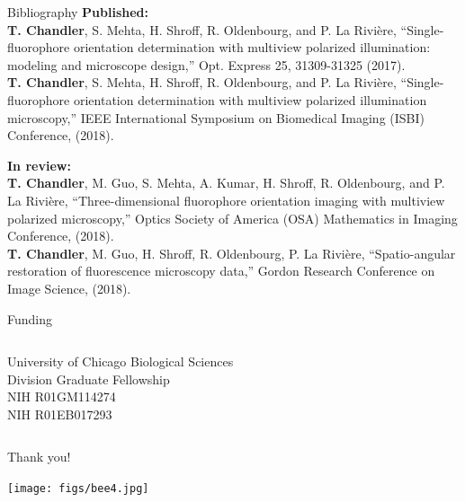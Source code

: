 \documentclass[presentation]{beamer}
\begin{document}
\begin{frame}{Bibliography}\small
\textbf{Published:}  \\ \vspace{0.5em}
\textbf{T. Chandler}, S. Mehta, H. Shroff, R. Oldenbourg, and P. La Rivière, ``Single-fluorophore orientation determination with multiview polarized illumination: modeling and microscope design,'' Opt. Express  25, 31309-31325 (2017).\\

\textbf{T. Chandler}, S. Mehta, H. Shroff, R. Oldenbourg, and P. La Rivière, ``Single-fluorophore orientation determination with multiview polarized illumination microscopy,'' IEEE International Symposium on Biomedical Imaging (ISBI) Conference, (2018).\\ \vspace{1em}

\textbf{In review:}\\ \vspace{0.5em}
\textbf{T. Chandler}, M. Guo, S. Mehta, A. Kumar, H. Shroff, R. Oldenbourg, and P. La Rivière, ``Three-dimensional fluorophore orientation imaging with multiview polarized microscopy,'' Optics Society of America (OSA) Mathematics in Imaging Conference, (2018).\\

\textbf{T. Chandler}, M. Guo, H. Shroff, R. Oldenbourg, P. La Rivière,
``Spatio-angular restoration of fluorescence microscopy data,'' Gordon Research
Conference on Image Science, (2018). \\
\end{frame}

\begin{frame}{Funding}
  \begin{columns}
    \begin{column}{0.75\textwidth}
      University of Chicago Biological Sciences\\ Division Graduate Fellowship \vspace{1em}\\
      NIH R01GM114274\\ \vspace{1em}
      NIH R01EB017293\\
    \end{column}
  \end{columns}
\end{frame}

\begin{frame}[label=sec-1]{\centering Thank you!}
 \begin{center}
   \texttt{[image: figs/bee4.jpg]}
 \end{center}
\end{frame}
\end{document}
